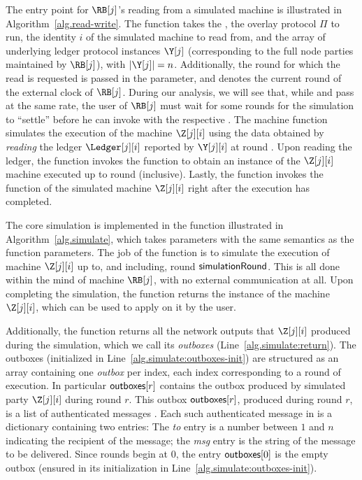 The entry point for $\RB[j]$'s reading from a simulated machine
is illustrated in Algorithm~\ref{alg.read-write}.
The \readFromMachine function takes the \sid, the overlay protocol $\Pi$ to run,
the identity $i$ of the simulated machine to read from,
and the array of underlying ledger protocol instances $\Y[j]$
(corresponding to the full node parties maintained by $\RB[j]$),
with $|\Y[j]| = n$. Additionally, the round for which the read is requested
is passed in the \simulationRound parameter, and \realityRound denotes the
current round of the external clock of $\RB[j]$. During our analysis, we will
see that, while \simulationRound and \realityRound pass at the same rate,
the user of $\RB[j]$ must wait for some \realityRound rounds for the simulation
to ``settle'' before he can invoke \readFromMachine with the respective \simulationRound.
The \readFromMachine machine function simulates the execution of the machine
$\Z[j][i]$ using the data obtained by \emph{reading} the ledger $\Ledger[j][i]$
reported by $\Y[j][i]$ at round \realityRound. Upon reading the ledger,
the \readFromMachine function invokes the \simulate function to obtain an instance
of the $\Z[j][i]$ machine executed up to round \simulationRound (inclusive).
Lastly, the \readFromMachine function invokes the \lread function of the simulated
machine $\Z[j][i]$ right after the \simulationRound execution has completed.

The core simulation is implemented in the function \simulate illustrated in
Algorithm~\ref{alg.simulate}, which takes parameters with the same semantics as
the \readFromMachine function parameters. The job of the \simulate function
is to simulate the execution of machine $\Z[j][i]$ up to, and including, round
$\textsf{simulationRound}$. This is all done within the mind of machine $\RB[j]$,
with no external communication at all. Upon completing the simulation,
the \simulate function returns the instance of the machine $\Z[j][i]$,
which can be used to apply \lread on it by the user.

Additionally, the
\simulate function returns all the network outputs that $\Z[j][i]$
produced during the simulation, which we call its \emph{outboxes}
(Line~\ref{alg.simulate:return}). The outboxes (initialized in
Line~\ref{alg.simulate:outboxes-init}) are structured as an array
containing one \emph{outbox} per index, each index corresponding to
a round of execution. In particular $\textsf{outboxes}[r]$ contains the
outbox produced by simulated party $\Z[j][i]$ during round $r$.
This outbox $\textsf{outboxes}[r]$, produced during round $r$, is a list
of authenticated messages \netouts. Each such authenticated
message \netout in \netouts is a dictionary containing two entries:
The \emph{to} entry is a number between $1$ and $n$
indicating the recipient of the message; the \emph{msg}
entry is the string of the message to be delivered.
Since rounds begin at $0$, the entry $\textsf{outboxes}[0]$ is the
empty outbox (ensured in its initialization in
Line~\ref{alg.simulate:outboxes-init}).

